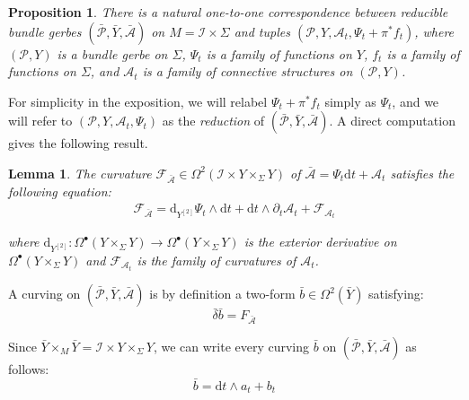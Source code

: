 \documentclass[10pt,reqno,a4paper]{amsart}
\theoremstyle{plain}
\newtheorem{prop}[thm]{Proposition}
\newtheorem{lemma}[thm]{Lemma}
\theoremstyle{definition}
\theoremstyle{remark}
\theoremstyle{remark}
\def\dd{\mathrm{d}}
\def\cA{\mathcal{A}}
\def\cI{\mathcal{I}}
\def\cP{\mathcal{P}}
\def\cF{\mathcal{F}}
\renewcommand{\(}{ (}
\renewcommand{\)}{ )}
\begin{document}
\begin{prop}
There is a natural one-to-one correspondence between reducible bundle gerbes $(\bar{\cP},\bar{Y},\bar{\cA})$ on $M = \cI\times \Sigma$ and tuples $(\cP,Y,\cA_t , \Psi_t + \pi^{\ast}f_t)$, where  $(\cP,Y)$ is a bundle gerbe on $\Sigma$, $\Psi_t$ is a family of functions on $Y$, $f_t$ is a family of functions on $\Sigma$, and $\cA_t$ is a family of connective structures on $(\cP,Y)$.
\end{prop} 


\noindent
For simplicity in the exposition, we will relabel $\Psi_t + \pi^{\ast}f_t$ simply as $\Psi_t$, and we will refer to $(\cP,Y, \cA_t , \Psi_t )$ as the \emph{reduction} of $(\bar{\cP},\bar{Y},\bar{\cA})$. A direct computation gives the following result.

\begin{lemma}
\label{lemma:gerbecurvaturedecomposition}
The curvature $\cF_{\bar{\cA}} \in \Omega^2(\cI \times Y\times_{\Sigma} Y)$ of $\bar{\cA} = \Psi_t \dd t + \cA_t$ satisfies the following equation:
\begin{eqnarray*}
\cF_{\bar{\cA}} = \dd_{Y^{[2]}} \Psi_t \wedge \dd t + \dd t \wedge \partial_t \cA_t + \cF_{\cA_t}
\end{eqnarray*}

\noindent
where $\dd_{Y^{[2]}}\colon \Omega^{\bullet}(Y\times_{\Sigma} Y) \to \Omega^{\bullet}(Y\times_{\Sigma} Y) $ is the exterior derivative on $\Omega^{\bullet}(Y\times_{\Sigma} Y)$ and $\cF_{\cA_t}$ is the family of curvatures of $\cA_t$.
\end{lemma}

\noindent
A curving on $(\bar{\cP},\bar{Y},\bar{\cA})$ is by definition a two-form $\bar{b}\in \Omega^2(\bar{Y})$ satisfying:
\begin{equation*}
\bar{\delta} \bar{b} = F_{\bar{\cA}}
\end{equation*}

\noindent 
Since $\bar{Y}\times_M \bar{Y} = \cI \times Y \times_{\Sigma} Y$, we can write every curving $\bar{b}$ on $(\bar{\cP},\bar{Y},\bar{\cA})$ as follows:
\begin{equation}
\label{eq:decompositionbarb}
\bar{b} = \dd t \wedge a_t + b_t
\end{equation}
\end{document}
